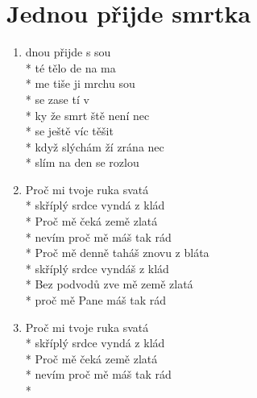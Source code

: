 \section{Jednou přijde smrtka}
\begin{enumerate}
\item {}dnou přijde  s sou \\*
té tělo de na ma \\*
me tiše ji mrchu sou \\*
 se zase tí v  \\*
ky že smrt ště není nec \\*
 se ještě  víc těšit  \\*
 když slýchám ží zrána nec \\*
slím na den  se rozlou  
\item Proč mi tvoje ruka svatá \\*
skříplý srdce vyndá z klád \\*
Proč mě čeká země zlatá \\*
nevím proč mě máš tak rád \\*
Proč mě denně taháš znovu z bláta \\*
skříplý srdce vyndáš z klád \\*
Bez podvodů zve mě země zlatá \\*
proč mě Pane máš tak rád 
\item Proč mi tvoje ruka svatá \\*
skříplý srdce vyndá z klád \\*
Proč mě čeká země zlatá \\*
nevím proč mě máš tak rád \\*
\end{enumerate}
